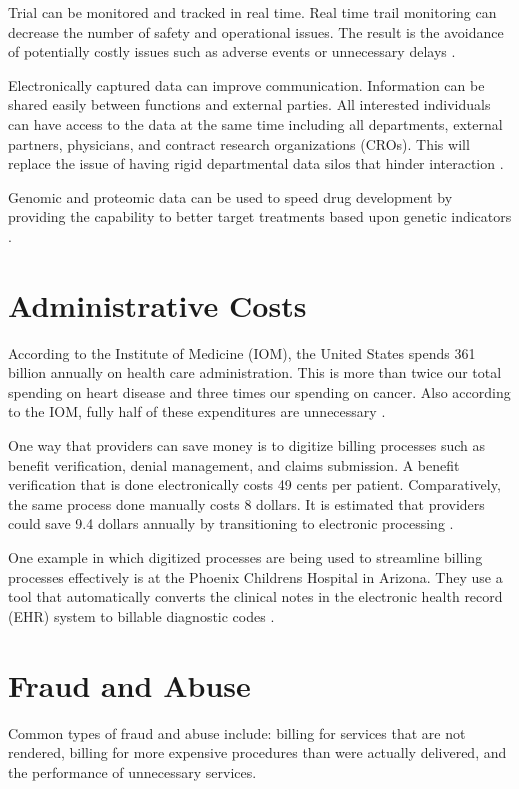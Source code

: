 \documentclass[sigconf]{acmart}
\begin{document}
Trial can be monitored and tracked in real time.  Real time trail monitoring can decrease the number of safety and operational issues. The result is the avoidance of potentially costly issues such as adverse events or unnecessary delays \cite{www-google-pharmrd}.

Electronically captured data can improve communication. Information can be shared easily between functions and external parties. All interested individuals can have access to the data at the same time including all departments, external partners, physicians, and contract research organizations (CROs). This will replace the issue of having rigid departmental data silos that hinder interaction \cite{www-google-pharmrd}. 

Genomic and proteomic data can be used to speed drug development by providing the capability to better target treatments based upon genetic indicators \cite{www-google-hadoop}.

\section{Administrative Costs}
According to the Institute of Medicine (IOM), the United States spends 361 billion annually on health care administration.  This is more than twice our total spending on heart disease and three times our spending on cancer. Also according to the IOM, fully half of these expenditures are unnecessary \cite{www-google-data}.

One way that providers can save money is to digitize billing processes such as benefit verification, denial management, and claims submission. A benefit verification that is done electronically costs 49 cents per patient.  Comparatively, the same process done manually costs 8 dollars.  It is estimated that providers could save 9.4 dollars annually by transitioning to electronic processing \cite{www-google-admin}. 

One example in which digitized processes are being used to streamline billing processes effectively is at the Phoenix Childrens Hospital in Arizona.  They use a tool that automatically converts the clinical notes in the electronic health record (EHR) system to billable diagnostic codes \cite{www-google-admin}. 

\section{Fraud and Abuse}

Common types of fraud and abuse include: billing for services that are not rendered, billing for more expensive procedures than were actually delivered, and the performance of unnecessary services. 
\end{document}
